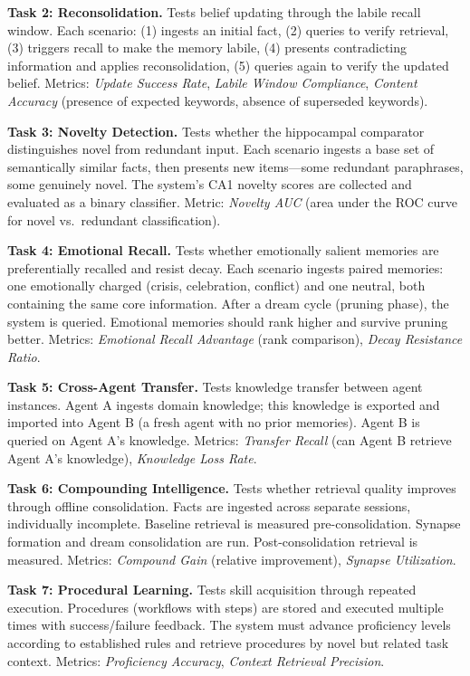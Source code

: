 \documentclass{article}
\begin{document}
\textbf{Task 2: Reconsolidation.} Tests belief updating through the labile recall window. Each scenario: (1) ingests an initial fact, (2) queries to verify retrieval, (3) triggers recall to make the memory labile, (4) presents contradicting information and applies reconsolidation, (5) queries again to verify the updated belief. Metrics: \emph{Update Success Rate}, \emph{Labile Window Compliance}, \emph{Content Accuracy} (presence of expected keywords, absence of superseded keywords).

\textbf{Task 3: Novelty Detection.} Tests whether the hippocampal comparator distinguishes novel from redundant input. Each scenario ingests a base set of semantically similar facts, then presents new items---some redundant paraphrases, some genuinely novel. The system's CA1 novelty scores are collected and evaluated as a binary classifier. Metric: \emph{Novelty AUC} (area under the ROC curve for novel vs.\ redundant classification).

\textbf{Task 4: Emotional Recall.} Tests whether emotionally salient memories are preferentially recalled and resist decay. Each scenario ingests paired memories: one emotionally charged (crisis, celebration, conflict) and one neutral, both containing the same core information. After a dream cycle (pruning phase), the system is queried. Emotional memories should rank higher and survive pruning better. Metrics: \emph{Emotional Recall Advantage} (rank comparison), \emph{Decay Resistance Ratio}.

\textbf{Task 5: Cross-Agent Transfer.} Tests knowledge transfer between agent instances. Agent A ingests domain knowledge; this knowledge is exported and imported into Agent B (a fresh agent with no prior memories). Agent B is queried on Agent A's knowledge. Metrics: \emph{Transfer Recall} (can Agent B retrieve Agent A's knowledge), \emph{Knowledge Loss Rate}.

\textbf{Task 6: Compounding Intelligence.} Tests whether retrieval quality improves through offline consolidation. Facts are ingested across separate sessions, individually incomplete. Baseline retrieval is measured pre-consolidation. Synapse formation and dream consolidation are run. Post-consolidation retrieval is measured. Metrics: \emph{Compound Gain} (relative improvement), \emph{Synapse Utilization}.

\textbf{Task 7: Procedural Learning.} Tests skill acquisition through repeated execution. Procedures (workflows with steps) are stored and executed multiple times with success/failure feedback. The system must advance proficiency levels according to established rules and retrieve procedures by novel but related task context. Metrics: \emph{Proficiency Accuracy}, \emph{Context Retrieval Precision}.
\end{document}
